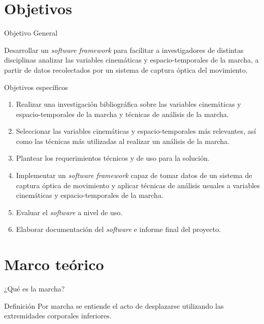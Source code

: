\documentclass{beamer} %
\begin{document}
\section{Objetivos}

\begin{frame}{Objetivo General}
    \begin{block}{}
        Desarrollar un \emph{software framework} para facilitar a investigadores de distintas disciplinas analizar las variables cinemáticas y espacio-temporales de la marcha, a partir de datos recolectados por un sistema de captura óptica del movimiento.
    \end{block}
\end{frame}

\begin{frame}{Objetivos específicos}
    \begin{enumerate}
        \item Realizar una investigación bibliográfica sobre las variables cinemáticas y espacio-temporales de la marcha y técnicas de análisis de la marcha. 
        \item Seleccionar las variables cinemáticas y espacio-temporales más relevantes, así como las técnicas más utilizadas al realizar un análisis de la marcha.
        \item Plantear los requerimientos técnicos y de uso para la solución. 
        \item Implementar un \emph{software framework} capaz de tomar datos de un sistema de captura óptica de movimiento y aplicar técnicas de análisis usuales a variables cinemáticas y espacio-temporales de la marcha. 
        \item Evaluar el \emph{software} a nivel de uso.
        \item Elaborar documentación del \emph{software} e informe final del proyecto. 
    \end{enumerate}
\end{frame}


\section{Marco teórico}

\begin{frame}{¿Qué es la marcha?}
    \begin{block}{Definición}
        Por marcha se entiende el acto de desplazarse utilizando las extremidades corporales inferiores.
    \end{block}
\end{frame}
\end{document}
